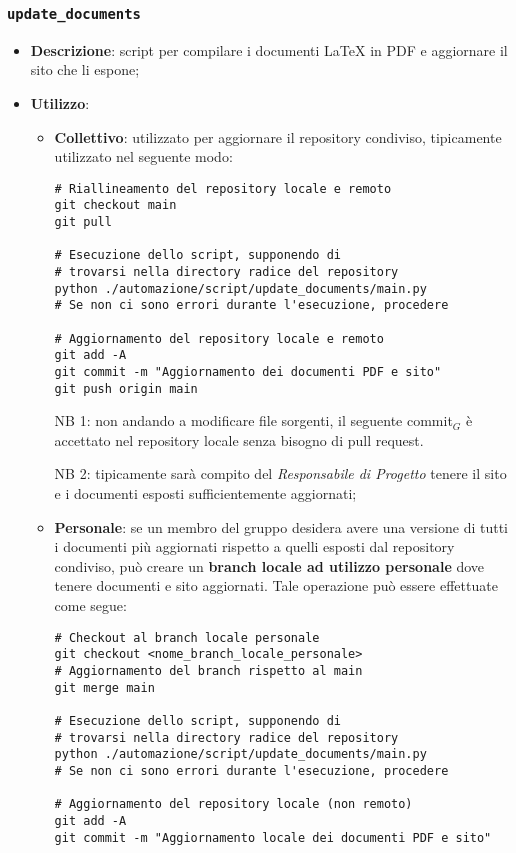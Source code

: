 \subsubsection{\texttt{update\_documents}}
\begin{itemize}
    \item \textbf{Descrizione}: script per compilare i documenti \LaTeX{} in PDF e aggiornare il sito che li espone;
    \item \textbf{Utilizzo}:
    \begin{itemize}
        \item \textbf{Collettivo}: utilizzato per aggiornare il repository condiviso, tipicamente utilizzato nel seguente modo:
\begin{Verbatim}[fontsize=\small]
# Riallineamento del repository locale e remoto
git checkout main
git pull

# Esecuzione dello script, supponendo di
# trovarsi nella directory radice del repository
python ./automazione/script/update_documents/main.py
# Se non ci sono errori durante l'esecuzione, procedere

# Aggiornamento del repository locale e remoto
git add -A
git commit -m "Aggiornamento dei documenti PDF e sito"
git push origin main
\end{Verbatim}

        NB 1: non andando a modificare file sorgenti, il seguente commit$_G$ è accettato nel repository locale senza bisogno di pull request.

        NB 2: tipicamente sarà compito del \textit{Responsabile di Progetto} tenere il sito e i documenti esposti sufficientemente aggiornati;

        \item \textbf{Personale}: se un membro del gruppo desidera avere una versione di tutti i documenti più aggiornati rispetto a quelli esposti dal repository condiviso, può creare un \textbf{branch locale ad utilizzo personale} dove tenere documenti e sito aggiornati. Tale operazione può essere effettuate come segue:
\begin{Verbatim}[fontsize=\small]
# Checkout al branch locale personale
git checkout <nome_branch_locale_personale>
# Aggiornamento del branch rispetto al main
git merge main

# Esecuzione dello script, supponendo di
# trovarsi nella directory radice del repository
python ./automazione/script/update_documents/main.py
# Se non ci sono errori durante l'esecuzione, procedere

# Aggiornamento del repository locale (non remoto)
git add -A
git commit -m "Aggiornamento locale dei documenti PDF e sito"
\end{Verbatim}
    \end{itemize}
\end{itemize}


